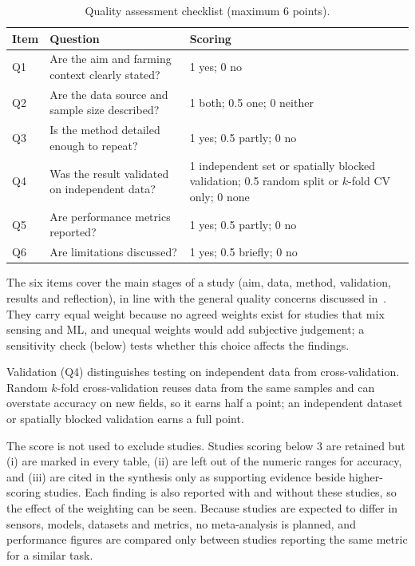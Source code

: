 \documentclass[conference]{IEEEtran}
\begin{document}
\begin{table}[t]
\caption{Quality assessment checklist (maximum 6 points).}
\label{tab:quality}
\centering
\footnotesize
\begin{tabular}{@{}p{0.6cm}p{3.1cm}p{3.8cm}@{}}
\toprule
Item & Question & Scoring\\
\midrule
Q1 & Are the aim and farming context clearly stated? & 1 yes; 0 no\\
Q2 & Are the data source and sample size described? & 1 both; 0.5 one; 0 neither\\
Q3 & Is the method detailed enough to repeat? & 1 yes; 0.5 partly; 0 no\\
Q4 & Was the result validated on independent data? & 1 independent set or spatially blocked validation; 0.5 random split or $k$-fold CV only; 0 none\\
Q5 & Are performance metrics reported? & 1 yes; 0.5 partly; 0 no\\
Q6 & Are limitations discussed? & 1 yes; 0.5 briefly; 0 no\\
\bottomrule
\end{tabular}
\end{table}

The six items cover the main stages of a study (aim, data, method, validation,
results and reflection), in line with the general quality concerns discussed
in~\cite{ref13}. They carry equal weight because no agreed weights exist for
studies that mix sensing and ML, and unequal weights would add subjective
judgement; a sensitivity check (below) tests whether this choice affects the
findings.

Validation (Q4) distinguishes testing on independent data from
cross-validation. Random $k$-fold cross-validation reuses data from the same
samples and can overstate accuracy on new fields, so it earns half a point; an
independent dataset or spatially blocked validation earns a full point.

The score is not used to exclude studies. Studies scoring below 3 are retained
but (i) are marked in every table, (ii) are left out of the numeric ranges for
accuracy, and (iii) are cited in the synthesis only as supporting evidence beside
higher-scoring studies. Each finding is also reported with and without these
studies, so the effect of the weighting can be seen. Because studies are expected
to differ in sensors, models, datasets and metrics, no meta-analysis is planned,
and performance figures are compared only between studies reporting the same
metric for a similar task.
\end{document}
